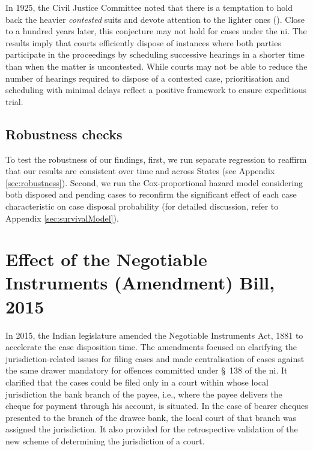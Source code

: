 \documentclass[12pt,a4paper]{article}
\begin{document}
In 1925, the Civil Justice Committee noted that there is a temptation to hold back the heavier \textit{contested} suits and devote attention to the lighter ones (\cite{cg1925_civiljustice}). Close to a hundred years later, this conjecture may not hold for cases under the \gls{ni}. The results imply that courts efficiently dispose of instances where both parties participate in the proceedings by scheduling successive hearings in a shorter time than when the matter is uncontested.
While courts may not be able to reduce the number of hearings required to dispose of a contested case, prioritisation and scheduling with minimal delays reflect a positive framework to ensure expeditious trial.

\subsection*{Robustness checks}

To test the robustness of our findings, first, we run separate regression to reaffirm that our results are consistent over time and across States (see Appendix \ref{sec:robustness}). Second, we run the Cox-proportional hazard model considering both disposed and pending cases to reconfirm the significant effect of each case characteristic on case disposal probability (for detailed discussion, refer to Appendix \ref{sec:survivalModel}).

\section{Effect of the Negotiable Instruments (Amendment) Bill, 2015} \label{sec:2015amend}

In 2015, the Indian legislature amended the Negotiable Instruments Act, 1881 to accelerate the case disposition time. The amendments focused on clarifying the jurisdiction-related issues for filing cases and made centralisation of cases against the same drawer mandatory for offences committed under \S~138 of the \gls{ni}. It clarified that the cases could be filed only in a court within whose local jurisdiction the bank branch of the payee, i.e., where the payee delivers the cheque for payment through his account, is situated. In the case of bearer cheques presented to the branch of the drawee bank, the local court of that branch was assigned the jurisdiction. It also provided for the retrospective validation of the new scheme of determining the jurisdiction of a court.
\end{document}

